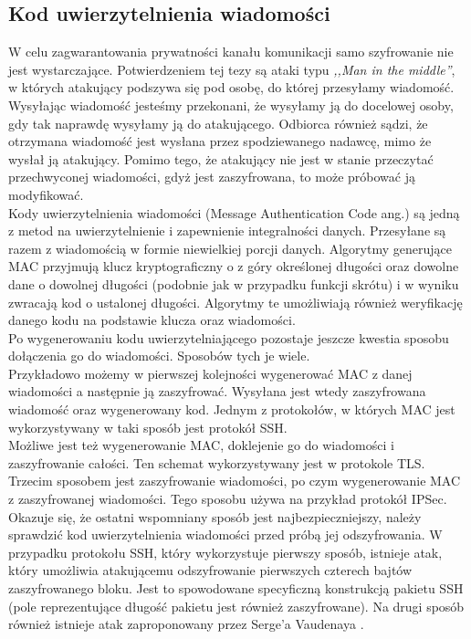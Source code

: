 \subsection{Kod uwierzytelnienia wiadomości}
W celu zagwarantowania prywatności kanału komunikacji samo szyfrowanie nie jest wystarczające. 
Potwierdzeniem tej tezy są ataki typu \textit{,,Man in the middle''}, w których atakujący podszywa się 
pod osobę, do której przesyłamy wiadomość. Wysyłając wiadomość jesteśmy przekonani, że wysyłamy ją do docelowej osoby,
gdy tak naprawdę wysyłamy ją do atakującego. Odbiorca również sądzi, że otrzymana wiadomość jest wysłana 
przez spodziewanego nadawcę, mimo że wysłał ją atakujący. Pomimo tego, że atakujący nie jest w stanie przeczytać
przechwyconej wiadomości, gdyż jest zaszyfrowana, to może próbować ją modyfikować. \\
Kody uwierzytelnienia wiadomości (Message Authentication Code ang.) są jedną z metod na uwierzytelnienie i zapewnienie 
integralności danych. Przesyłane są razem z wiadomością w formie niewielkiej porcji danych.
Algorytmy generujące MAC przyjmują klucz kryptograficzny o z góry określonej długości oraz dowolne dane 
o dowolnej długości (podobnie jak w przypadku funkcji skrótu) i w wyniku zwracają kod o ustalonej długości.
Algorytmy te umożliwiają również weryfikację danego kodu na podstawie klucza oraz wiadomości. \\
Po wygenerowaniu kodu uwierzytelniającego pozostaje jeszcze kwestia sposobu dołączenia go do wiadomości.
Sposobów tych je wiele. \\
Przykładowo możemy w pierwszej kolejności wygenerować MAC z danej wiadomości a następnie ją zaszyfrować. 
Wysyłana jest wtedy zaszyfrowana wiadomość oraz wygenerowany kod. Jednym z protokołów, w których 
MAC jest wykorzystywany w taki sposób jest protokół SSH. \\
Możliwe jest też wygenerowanie MAC, doklejenie go do wiadomości i zaszyfrowanie całości.
Ten schemat wykorzystywany jest w protokole TLS. \\
Trzecim sposobem jest zaszyfrowanie wiadomości, po czym wygenerowanie MAC z zaszyfrowanej wiadomości.
Tego sposobu używa na przykład protokół IPSec. \\
Okazuje się, że ostatni wspomniany sposób jest najbezpieczniejszy, należy sprawdzić kod uwierzytelnienia wiadomości
przed próbą jej odszyfrowania. W przypadku protokołu SSH, który wykorzystuje pierwszy sposób, istnieje atak, 
który umożliwia atakującemu odszyfrowanie pierwszych czterech bajtów zaszyfrowanego bloku. Jest to spowodowane 
specyficzną konstrukcją pakietu SSH (pole reprezentujące długość pakietu jest również zaszyfrowane).
Na drugi sposób również istnieje atak zaproponowany przez Serge'a Vaudenaya \cite{tls}.

